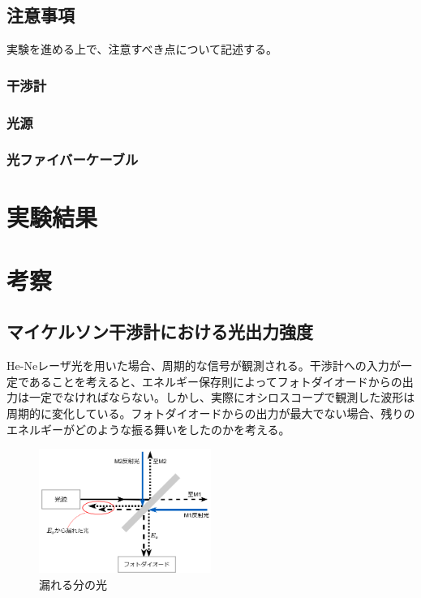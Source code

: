 \documentclass[uplatex, titlepage, fontsize=10pt, paper=a4paper]{jsarticle}
\numberwithin{equation}{section}
\begin{document}
\subsection{注意事項}
実験を進める上で、注意すべき点について記述する。

\subsubsection{干渉計}


\subsubsection{光源}

\subsubsection{光ファイバーケーブル}


\section{実験結果}


\section{考察}

\subsection{マイケルソン干渉計における光出力強度}
He-Neレーザ光を用いた場合、周期的な信号が観測される。干渉計への入力が一定であることを考えると、エネルギー保存則によってフォトダイオードからの出力は一定でなければならない。しかし、実際にオシロスコープで観測した波形は周期的に変化している。フォトダイオードからの出力が最大でない場合、残りのエネルギーがどのような振る舞いをしたのかを考える。

\begin{figure}
    \centering
    \includegraphics[width = 0.5\textwidth]{画像フォルダ/interference_detail.png}
    \caption{漏れる分の光}
    \label{interferometer_detail}
\end{figure}
\end{document}

